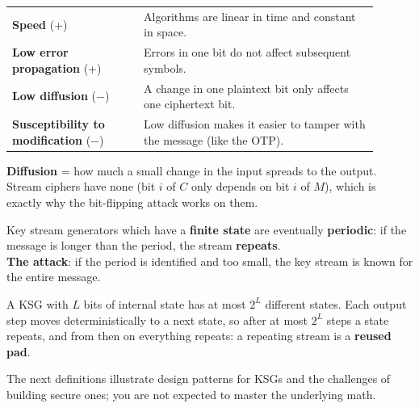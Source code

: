 \begin{propbox}[title=Stream ciphers: strengths and weaknesses]
\begin{center}
\begin{tabular}{p{0.32\linewidth}|p{0.58\linewidth}}
\textbf{Speed} (+) & Algorithms are linear in time and constant in space. \\
\textbf{Low error propagation} (+) & Errors in one bit do not affect subsequent
symbols. \\ \hline
\textbf{Low diffusion} ($-$) & A change in one plaintext bit only affects one ciphertext
bit. \\
\textbf{Susceptibility to modification} ($-$) & Low diffusion makes it easier to tamper
with the message (like the OTP).
\end{tabular}
\end{center}
\end{propbox}

\begin{rembox}[title=Diffusion]
\textbf{Diffusion} = how much a small change in the input spreads to the output. Stream
ciphers have none (bit $i$ of $C$ only depends on bit $i$ of $M$), which is exactly why
the bit-flipping attack works on them.
\end{rembox}

\begin{defnbox}[title=Periodicity of key stream generators]
Key stream generators which have a \textbf{finite state} are eventually
\textbf{periodic}: if the message is longer than the period, the stream
\textbf{repeats}. \\
\textbf{The attack}: if the period is identified and too small, the key stream is known
for the entire message.
\end{defnbox}

\begin{rembox}[title=Why finite state implies periodic]
A KSG with $L$ bits of internal state has at most $2^L$ different states. Each output
step moves deterministically to a next state, so after at most $2^L$ steps a state
repeats, and from then on everything repeats: a repeating stream is a \textbf{reused
pad}.
\end{rembox}

\begin{rembox}[title=Interlude on building KSGs]
The next definitions illustrate design patterns for KSGs and the challenges of building
secure ones; you are not expected to master the underlying math.
\end{rembox}

